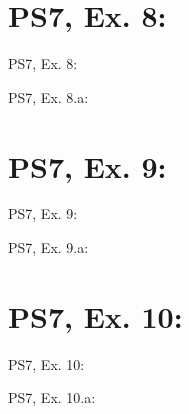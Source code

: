 \section{PS7, Ex. 8: }

\begin{frame}{PS7, Ex. 8: }
  \begin{multicols}{2}
    \vfill\null\columnbreak
    \vfill\null
  \end{multicols}
\end{frame}

\begin{frame}{PS7, Ex. 8.a: }
  \begin{multicols}{2}
    \vfill\null\columnbreak
    \vfill\null
  \end{multicols}
\end{frame}



\section{PS7, Ex. 9: }

\begin{frame}{PS7, Ex. 9: }
  \begin{multicols}{2}
    \vfill\null\columnbreak
    \vfill
  \end{multicols}
\end{frame}

\begin{frame}{PS7, Ex. 9.a: }
  \begin{multicols}{2}
    \vfill\null\columnbreak
    \vfill\null
  \end{multicols}
\end{frame}



\section{PS7, Ex. 10: }

\begin{frame}{PS7, Ex. 10: }
  \begin{multicols}{2}
    \vfill\null\columnbreak
    \vfill\null
  \end{multicols}
\end{frame}

\begin{frame}{PS7, Ex. 10.a: }
  \begin{multicols}{2}
    \vfill\null\columnbreak
    \vfill\null
  \end{multicols}
\end{frame}
